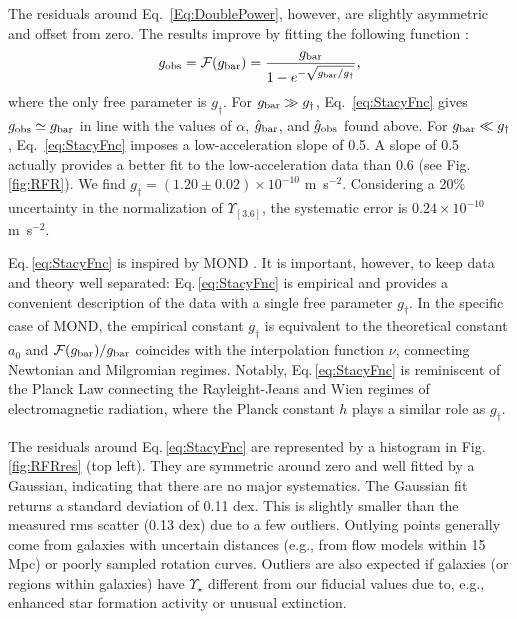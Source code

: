 \documentclass[apjl, twocolappendix]{emulateapj}
\begin{document}
The residuals around Eq.~\ref{Eq:DoublePower}, however, are slightly asymmetric and offset from zero. The results improve by fitting the following function \citep{McGaugh2008, McGaugh2014}:
\begin{equation}\label{eq:StacyFnc}
 g_{\rm obs} = \mathcal{F}(g_{\rm bar}) = \dfrac{g_{\rm bar}}{1 - e^{-\sqrt{g_{\rm bar}/g_\dag} } },
\end{equation}
where the only free parameter is $g_\dag$. For $g_{\rm bar} \gg g_\dag$, Eq.~\ref{eq:StacyFnc} gives $g_{\rm obs} \simeq g_{\rm bar}$ in line with the values of $\alpha$, $\hat{g}_{\rm bar}$, and $\hat{g}_{\rm obs}$ found above. For $g_{\rm bar} \ll g_\dag$, Eq.~\ref{eq:StacyFnc} imposes a low-acceleration slope of 0.5. A slope of 0.5 actually provides a better fit to the low-acceleration data than 0.6 (see Fig.\,\ref{fig:RFR}). We find $g_\dag = (1.20 \pm 0.02) \times 10^{-10}$ m~s$^{-2}$. Considering a 20$\%$ uncertainty in the normalization of $\Upsilon_{[3.6]}$, the systematic error is $0.24 \times 10^{-10}$ m~s$^{-2}$.

Eq.\,\ref{eq:StacyFnc} is inspired by MOND \citep{Milgrom1983}. It is important, however, to keep data and theory well separated: Eq.\,\ref{eq:StacyFnc} is empirical and provides a convenient description of the data with a single free parameter $g_\dag$. In the specific case of MOND, the empirical constant $g_\dag$ is equivalent to the theoretical constant $a_{0}$ and $\mathcal{F}(g_{\rm bar})/g_{\rm bar}$ coincides with the interpolation function $\nu$, connecting Newtonian and Milgromian regimes. Notably, Eq.\,\ref{eq:StacyFnc} is reminiscent of the Planck Law connecting the Rayleight-Jeans and Wien regimes of electromagnetic radiation, where the Planck constant $h$ plays a similar role as $g_\dag$.

The residuals around Eq.\,\ref{eq:StacyFnc} are represented by a histogram in Fig.\,\ref{fig:RFRres} (top left). They are symmetric around zero and well fitted by a Gaussian, indicating that there are no major systematics. The Gaussian fit returns a standard deviation of 0.11 dex. This is slightly smaller than the measured rms scatter (0.13 dex) due to a few outliers. Outlying points generally come from galaxies with uncertain distances (e.g., from flow models within 15 Mpc) or poorly sampled rotation curves. Outliers are also expected if galaxies (or regions within galaxies) have $\Upsilon_{\star}$ different from our fiducial values due to, e.g., enhanced star formation activity or unusual extinction.
\end{document}
